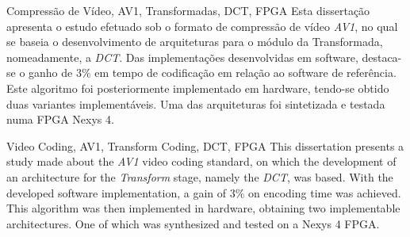 \TitlePage
  \vspace*{55mm}
       {Compressão de Vídeo, AV1, Transformadas, DCT, FPGA}
       {Esta dissertação apresenta o estudo efetuado sob o formato de compressão de vídeo \emph{AV1}, no qual se baseia o desenvolvimento de arquiteturas para o módulo da Transformada, nomeadamente, a \emph{DCT}. Das implementações desenvolvidas em software, destaca-se o ganho de $3\%$ em tempo de codificação em relação ao software de referência.}
  \TEXT{}
       {Este algoritmo foi posteriormente implementado em hardware, tendo-se obtido duas variantes implementáveis. Uma das arquiteturas foi sintetizada e testada numa FPGA Nexys 4.}
\EndTitlePage
\titlepage\ \endtitlepage %

\TitlePage
  \vspace*{55mm}
       {Video Coding, AV1, Transform Coding, DCT, FPGA}
       {This dissertation presents a study made about the \emph{AV1} video coding standard, on which the development of an architecture for the \emph{Transform} stage, namely the \emph{DCT}, was based. With the developed software implementation, a gain of $3\%$ on encoding time was achieved.}
  \TEXT{}
       {This algorithm was then implemented in hardware, obtaining two implementable architectures. One of which was synthesized and tested on a Nexys 4 FPGA.}
\EndTitlePage
\titlepage\ \endtitlepage %
